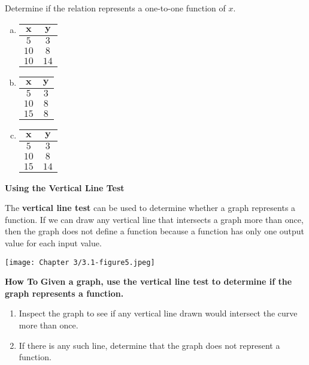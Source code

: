 \documentclass[12pt]{book}
\begin{document}
Determine if the relation represents a one-to-one function of $x$.
\begin{multicols}{3}
    

\begin{enumerate}[(a)]
    \item {
\begin{tabular}{ |c|c| } 
 \hline
 \textbf{$\mathbf{x}$} & $\mathbf{y}$ \\ 
    \hline
    $5$ & $3$ \\
    \hline
    $10$ & $8$ \\
     \hline
    $10$ & $14$ \\
    \hline
\end{tabular} 
}
 \item {
\begin{tabular}{ |c|c| } 
 \hline
 \textbf{$\mathbf{x}$} & $\mathbf{y}$ \\ 
    \hline
    $5$ & $3$ \\
    \hline
    $10$ & $8$ \\
     \hline
    $15$ & $8$ \\
    \hline
\end{tabular} 
}
   \item {
\begin{tabular}{ |c|c| } 
 \hline
 \textbf{$\mathbf{x}$} & $\mathbf{y}$ \\ 
    \hline
    $5$ & $3$ \\
    \hline
    $10$ & $8$ \\
     \hline
    $15$ & $14$ \\
    \hline
\end{tabular} 
}
\end{enumerate}
\end{multicols}


\newpage
\textbf{\large Using the Vertical Line Test}

The \textbf{vertical line test} can be used to determine whether a graph represents a function. If we can draw any vertical line that intersects a graph more than once, then the graph does not define a function because a function has only one output value for each input value.

\vspace{5mm}
\texttt{[image: Chapter 3/3.1-figure5.jpeg]}
\vspace{3mm}
\begin{boxR}
    \textbf{How To}
    \vspace{1mm}
    \hline
    \vspace{2mm}
    \textbf{Given a graph, use the vertical line test to determine if the graph represents a function.}
    \begin{enumerate}
        \item Inspect the graph to see if any vertical line drawn would intersect the curve more than once.
        \item If there is any such line, determine that the graph does not represent a function.
    \end{enumerate}
\end{boxR}
\end{document}
